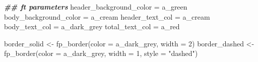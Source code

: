 \documentclass[
]{book}
\newenvironment{Shaded}{\begin{snugshade}}{\end{snugshade}}
\newcommand{\AttributeTok}[1]{\textcolor[rgb]{0.77,0.63,0.00}{#1}}
\newcommand{\DecValTok}[1]{\textcolor[rgb]{0.00,0.00,0.81}{#1}}
\newcommand{\DocumentationTok}[1]{\textcolor[rgb]{0.56,0.35,0.01}{\textbf{\textit{#1}}}}
\newcommand{\FunctionTok}[1]{\textcolor[rgb]{0.00,0.00,0.00}{#1}}
\newcommand{\NormalTok}[1]{#1}
\newcommand{\OtherTok}[1]{\textcolor[rgb]{0.56,0.35,0.01}{#1}}
\newcommand{\StringTok}[1]{\textcolor[rgb]{0.31,0.60,0.02}{#1}}
\begin{document}
\begin{Shaded}
\begin{Highlighting}[]
\DocumentationTok{\#\# ft parameters}
\NormalTok{header\_background\_color }\OtherTok{=}\NormalTok{ a\_green}
\NormalTok{body\_background\_color }\OtherTok{=}\NormalTok{ a\_cream}
\NormalTok{header\_text\_col }\OtherTok{=}\NormalTok{ a\_cream}
\NormalTok{body\_text\_col }\OtherTok{=}\NormalTok{ a\_dark\_grey}
\NormalTok{total\_text\_col }\OtherTok{=}\NormalTok{ a\_red}

\NormalTok{border\_solid }\OtherTok{\textless{}{-}} \FunctionTok{fp\_border}\NormalTok{(}\AttributeTok{color =}\NormalTok{ a\_dark\_grey, }\AttributeTok{width =} \DecValTok{2}\NormalTok{)}
\NormalTok{border\_dashed }\OtherTok{\textless{}{-}} \FunctionTok{fp\_border}\NormalTok{(}\AttributeTok{color =}\NormalTok{ a\_dark\_grey, }\AttributeTok{width =} \DecValTok{1}\NormalTok{, }\AttributeTok{style =} \StringTok{"dashed"}\NormalTok{)}


\end{Highlighting}
\end{Shaded}
\end{document}
